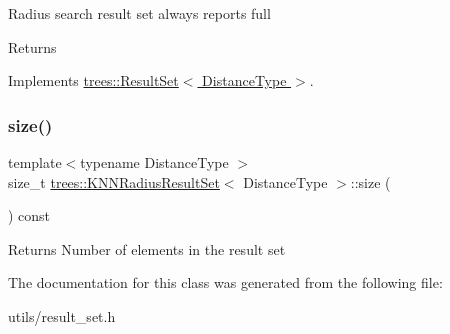 Radius search result set always reports full \begin{DoxyReturn}{Returns}

\end{DoxyReturn}


Implements \hyperlink{classtrees_1_1_result_set}{trees\+::\+Result\+Set$<$ Distance\+Type $>$}.

\mbox{\label{classtrees_1_1_k_n_n_radius_result_set_a3e6a6b74d2dbf9792f4ed632ce4be376}} 
\subsubsection{\texorpdfstring{size()}{size()}}
{\footnotesize\ttfamily template$<$typename Distance\+Type $>$ \\
size\+\_\+t \hyperlink{classtrees_1_1_k_n_n_radius_result_set}{trees\+::\+K\+N\+N\+Radius\+Result\+Set}$<$ Distance\+Type $>$\+::size (\begin{DoxyParamCaption}{ }\end{DoxyParamCaption}) const\hspace{0.3cm}{\ttfamily [inline]}}

\begin{DoxyReturn}{Returns}
Number of elements in the result set 
\end{DoxyReturn}


The documentation for this class was generated from the following file\+:\begin{DoxyCompactItemize}
\item 
utils/result\+\_\+set.\+h\end{DoxyCompactItemize}
